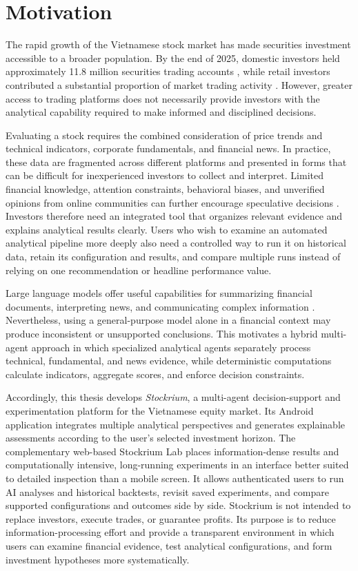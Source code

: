 \section{Motivation}
\label{sec:motivation}

The rapid growth of the Vietnamese stock market has made securities investment accessible to a broader population. By the end of 2025, domestic investors held approximately 11.8 million securities trading accounts \cite{vsdc2026}, while retail investors contributed a substantial proportion of market trading activity \cite{vinacapital2024}. However, greater access to trading platforms does not necessarily provide investors with the analytical capability required to make informed and disciplined decisions.

Evaluating a stock requires the combined consideration of price trends and technical indicators, corporate fundamentals, and financial news. In practice, these data are fragmented across different platforms and presented in forms that can be difficult for inexperienced investors to collect and interpret. Limited financial knowledge, attention constraints, behavioral biases, and unverified opinions from online communities can further encourage speculative decisions \cite{barberOdean2013}. Investors therefore need an integrated tool that organizes relevant evidence and explains analytical results clearly. Users who wish to examine an automated analytical pipeline more deeply also need a controlled way to run it on historical data, retain its configuration and results, and compare multiple runs instead of relying on one recommendation or headline performance value.

Large language models offer useful capabilities for summarizing financial documents, interpreting news, and communicating complex information \cite{wu2023bloomberggpt,yang2023fingpt}. Nevertheless, using a general-purpose model alone in a financial context may produce inconsistent or unsupported conclusions. This motivates a hybrid multi-agent approach in which specialized analytical agents separately process technical, fundamental, and news evidence, while deterministic computations calculate indicators, aggregate scores, and enforce decision constraints.

Accordingly, this thesis develops \textit{Stockrium}, a multi-agent decision-support and experimentation platform for the Vietnamese equity market. Its Android application integrates multiple analytical perspectives and generates explainable assessments according to the user's selected investment horizon. The complementary web-based Stockrium Lab places information-dense results and computationally intensive, long-running experiments in an interface better suited to detailed inspection than a mobile screen. It allows authenticated users to run AI analyses and historical backtests, revisit saved experiments, and compare supported configurations and outcomes side by side. Stockrium is not intended to replace investors, execute trades, or guarantee profits. Its purpose is to reduce information-processing effort and provide a transparent environment in which users can examine financial evidence, test analytical configurations, and form investment hypotheses more systematically.
